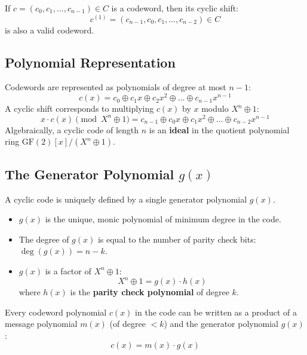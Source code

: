 \documentclass[12pt,a4paper]{article}
\begin{document}
\begin{tcolorbox}[defbox, title={\textbf{Formal Cyclic Shift Property}}]
If $c = (c_0, c_1, \dots, c_{n-1}) \in C$ is a codeword, then its cyclic shift:
\[ c^{(1)} = (c_{n-1}, c_0, c_1, \dots, c_{n-2}) \in C \]
is also a valid codeword.
\end{tcolorbox}

\subsection{Polynomial Representation}
Codewords are represented as polynomials of degree at most $n-1$:
\[ c(x) = c_0 \oplus c_1 x \oplus c_2 x^2 \oplus \dots \oplus c_{n-1} x^{n-1} \]
A cyclic shift corresponds to multiplying $c(x)$ by $x$ modulo $X^n \oplus 1$:
\[ x \cdot c(x) \pmod{X^n \oplus 1} = c_{n-1} \oplus c_0 x \oplus c_1 x^2 \oplus \dots \oplus c_{n-2} x^{n-1} \]
Algebraically, a cyclic code of length $n$ is an \textbf{ideal} in the quotient polynomial ring $\text{GF}(2)[x] / (X^n \oplus 1)$.

\subsection{The Generator Polynomial \texorpdfstring{$g(x)$}{g(x)}}
A cyclic code is uniquely defined by a single generator polynomial $g(x)$.
\begin{tcolorbox}[defbox, title={\textbf{Properties of the Generator Polynomial}}]
\begin{itemize}[leftmargin=*, itemsep=3pt, topsep=0pt]
  \item $g(x)$ is the unique, monic polynomial of minimum degree in the code.
  \item The degree of $g(x)$ is equal to the number of parity check bits: $\deg(g(x)) = n - k$.
  \item $g(x)$ is a factor of $X^n \oplus 1$:
    \[ X^n \oplus 1 = g(x) \cdot h(x) \]
    where $h(x)$ is the \textbf{parity check polynomial} of degree $k$.
\end{itemize}
\end{tcolorbox}

Every codeword polynomial $c(x)$ in the code can be written as a product of a message polynomial $m(x)$ (of degree $< k$) and the generator polynomial $g(x)$:
\[ c(x) = m(x) \cdot g(x) \]
\end{document}
